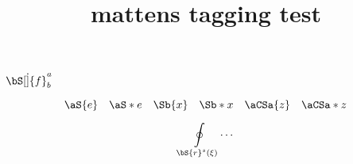\documentclass{article}
\title{mattens tagging test}
\begin{document}
$\bS[\dot]{f}^a_b$

\[
\aS{e} \quad \aS*{e} \quad
\Sb{x} \quad \Sb*{x} \quad
\aCSa{z} \quad \aCSa*{z}
\]

\begin{equation*}
\oint\limits_{\bS{r}^s(\xi)} \dotsi
\end{equation*}
\end{document}
